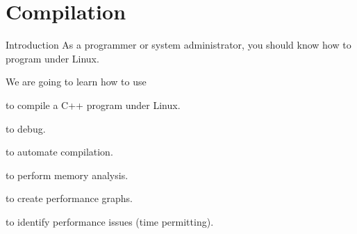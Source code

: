 \documentclass[14pt,aspectratio=1610]{beamer}
\begin{document}

\section{Compilation}

\begin{frame}{Introduction}
As a programmer or system administrator, you should know how to program under Linux.

We are going to learn how to use\textellipsis{}\vspace{-0.8em}%
\begin{description}
\item[\colorbox{codeBackground}{\texttt{g++}}] to compile a C++ program under Linux.
\item[\colorbox{codeBackground}{\texttt{gdb \& \texttt{ddd}}}] to debug.
\item[\colorbox{codeBackground}{\texttt{make}}] to automate compilation.
\item[\colorbox{codeBackground}{\texttt{valgrind}}] to perform memory analysis.
\item[\colorbox{codeBackground}{\texttt{gnuplot}}] to create performance graphs.
\item[\colorbox{codeBackground}{\texttt{perf}}] to identify performance issues (time permitting).
\end{description}
\end{frame}
\end{document}
